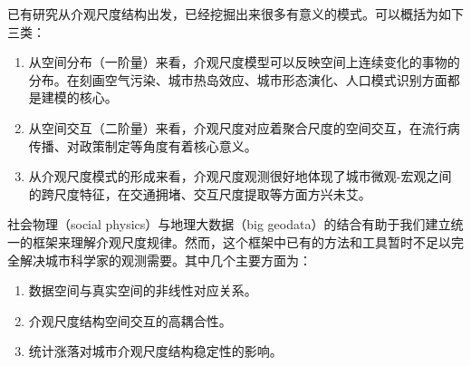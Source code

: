 已有研究从介观尺度结构出发，已经挖掘出来很多有意义的模式。可以概括为如下三类：\begin{enumerate}
    \item 从空间分布（一阶量）来看，介观尺度模型可以反映空间上连续变化的事物的分布。在刻画空气污染\cite{mijling2012using}、城市热岛效应、城市形态演化\cite{raimbault2018calibration}、人口模式识别方面都是建模的核心。
    \item 从空间交互（二阶量）来看，介观尺度对应着聚合尺度的空间交互，在流行病传播、对政策制定等角度有着核心意义。%
    \item 从介观尺度模式的形成来看，介观尺度观测很好地体现了城市微观-宏观之间的跨尺度特征，在交通拥堵、交互尺度提取等方面方兴未艾。
\end{enumerate} 


社会物理（social physics）与地理大数据（big geodata）的结合有助于我们建立统一的框架来理解介观尺度规律。然而，这个框架中已有的方法和工具暂时不足以完全解决城市科学家的观测需要。其中几个主要方面为：\begin{enumerate}
    \item 数据空间与真实空间的非线性对应关系。
    \item 介观尺度结构空间交互的高耦合性。
    \item 统计涨落对城市介观尺度结构稳定性的影响。
\end{enumerate}




